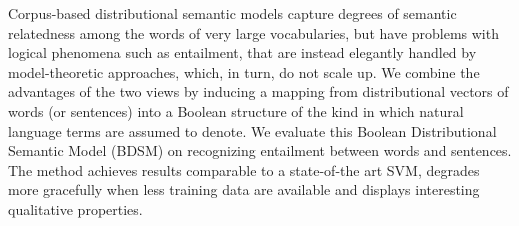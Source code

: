 Corpus-based distributional semantic models capture degrees of semantic relatedness among the words of very large vocabularies, but have problems with logical phenomena such as entailment, that are instead elegantly handled by model-theoretic approaches, which, in turn, do not scale up. We combine the advantages of the two views by inducing a mapping from distributional vectors of words (or sentences) into a Boolean structure of the kind in which natural language terms are assumed to denote. We evaluate this Boolean Distributional Semantic Model (BDSM) on recognizing entailment between words and sentences. The method achieves results comparable to a state-of-the art SVM, degrades more gracefully when less training data are available and displays interesting qualitative properties.
